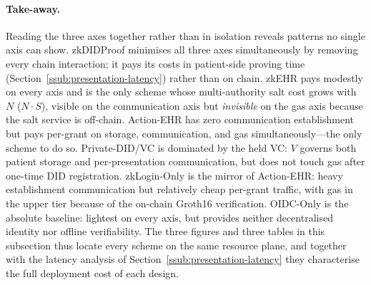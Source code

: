 \paragraph{Take-away.}
Reading the three axes together rather than in isolation reveals
patterns no single axis can show. \textsf{zkDIDProof} minimises all
three axes simultaneously by removing every chain interaction; it pays
its costs in patient-side proving time (Section~\ref{ssub:presentation-latency})
rather than on chain. \textsf{zkEHR} pays modestly on every axis and is
the only scheme whose multi-authority salt cost grows with $N$
($N\!\cdot\!S$), visible on the communication axis but \emph{invisible}
on the gas axis because the salt service is off-chain. \textsf{Action-EHR}
has zero communication establishment but pays per-grant on storage,
communication, and gas simultaneously---the only scheme to do so.
\textsf{Private-DID/VC} is dominated by the held VC: $V$ governs both
patient storage and per-presentation communication, but does not touch
gas after one-time DID registration. \textsf{zkLogin-Only} is the
mirror of \textsf{Action-EHR}: heavy establishment communication but
relatively cheap per-grant traffic, with gas in the upper tier because
of the on-chain Groth16 verification. \textsf{OIDC-Only} is the
absolute baseline: lightest on every axis, but provides neither
decentralised identity nor offline verifiability. The three figures
and three tables in this subsection thus locate every scheme on the
same resource plane, and together with the latency analysis of
Section~\ref{ssub:presentation-latency} they characterise the full
deployment cost of each design.
